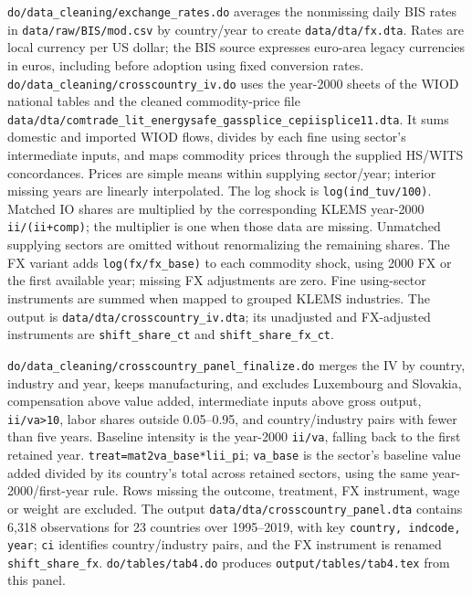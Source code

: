 \documentclass[11pt]{article}
\newcommand{\pkgfile}[1]{\nolinkurl{#1}}
\begin{document}
\pkgfile{do/data_cleaning/exchange_rates.do} averages the nonmissing daily
BIS rates in \pkgfile{data/raw/BIS/mod.csv} by country/year to create
\pkgfile{data/dta/fx.dta}. Rates are local currency per US dollar; the BIS
source expresses euro-area legacy currencies in euros, including before
adoption using fixed conversion rates.
\pkgfile{do/data_cleaning/crosscountry_iv.do} uses the year-2000 sheets of
the WIOD national tables and the cleaned commodity-price file
\pkgfile{data/dta/comtrade_lit_energysafe_gassplice_cepiisplice11.dta}.
It sums domestic and imported WIOD flows, divides by each fine using
sector's intermediate inputs, and maps commodity prices through the
supplied HS/WITS concordances. Prices are simple means within supplying
sector/year; interior missing years are linearly interpolated. The log
shock is \texttt{log(ind\_tuv/100)}. Matched IO shares are multiplied by
the corresponding KLEMS year-2000 \texttt{ii/(ii+comp)}; the multiplier is
one when those data are missing. Unmatched supplying sectors are omitted
without renormalizing the remaining shares. The FX variant adds
\texttt{log(fx/fx\_base)} to each commodity shock, using 2000 FX or the
first available year; missing FX adjustments are zero. Fine using-sector
instruments are summed when mapped to grouped KLEMS industries. The output
is \pkgfile{data/dta/crosscountry_iv.dta}; its unadjusted and FX-adjusted
instruments are \texttt{shift\_share\_ct} and
\texttt{shift\_share\_fx\_ct}.

\pkgfile{do/data_cleaning/crosscountry_panel_finalize.do} merges the IV by
country, industry and year, keeps manufacturing, and excludes Luxembourg
and Slovakia, compensation above value added, intermediate inputs above
gross output, \texttt{ii/va>10}, labor shares outside 0.05--0.95, and
country/industry pairs with fewer than five years. Baseline intensity is
the year-2000 \texttt{ii/va}, falling back to the first retained year.
\texttt{treat=mat2va\_base*lii\_pi}; \texttt{va\_base} is the sector's
baseline value added divided by its country's total across retained
sectors, using the same year-2000/first-year rule. Rows missing the outcome,
treatment, FX instrument, wage or weight are excluded. The output
\pkgfile{data/dta/crosscountry_panel.dta} contains 6,318 observations for
23 countries over 1995--2019, with key \texttt{country, indcode, year};
\texttt{ci} identifies country/industry pairs, and the FX instrument is
renamed \texttt{shift\_share\_fx}. \pkgfile{do/tables/tab4.do} produces
\pkgfile{output/tables/tab4.tex} from this panel.
\end{document}
